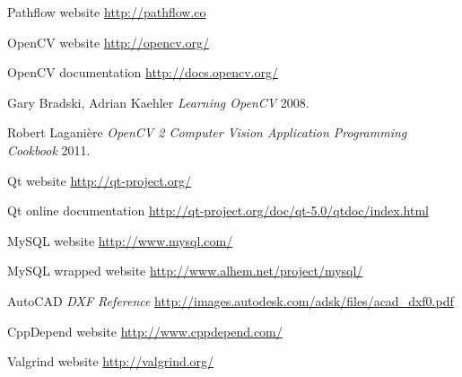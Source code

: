 \begin{thebibliography}{1}

 Pathflow website \url{http://pathflow.co}

 OpenCV website \url{http://opencv.org/}

 OpenCV documentation \url{http://docs.opencv.org/}

 Gary Bradski, Adrian Kaehler {\em Learning OpenCV} 2008.

 Robert Laganière {\em OpenCV 2 Computer Vision Application Programming Cookbook} 2011.

 Qt website \url{http://qt-project.org/}

 Qt online documentation \url{http://qt-project.org/doc/qt-5.0/qtdoc/index.html}

 MySQL website \url{http://www.mysql.com/}

 MySQL wrapped website \url{http://www.alhem.net/project/mysql/}

 AutoCAD {\em DXF Reference} \url{http://images.autodesk.com/adsk/files/acad_dxf0.pdf}

 CppDepend website \url{http://www.cppdepend.com/}

 Valgrind website \url{http://valgrind.org/}


\end{thebibliography}